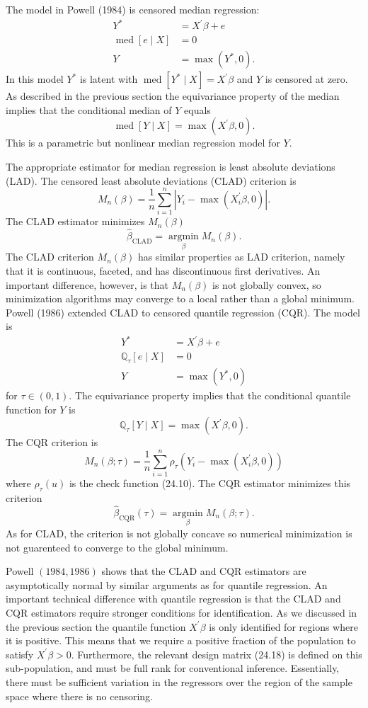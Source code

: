 \documentclass[10pt]{article}
\begin{document}
The model in Powell (1984) is censored median regression:
$$
\begin{aligned}
Y^{*} &=X^{\prime} \beta+e \\
\operatorname{med}[e \mid X] &=0 \\
Y &=\max \left(Y^{*}, 0\right) .
\end{aligned}
$$
In this model $Y^{*}$ is latent with $\operatorname{med}\left[Y^{*} \mid X\right]=X^{\prime} \beta$ and $Y$ is censored at zero. As described in the previous section the equivariance property of the median implies that the conditional median of $Y$ equals
$$
\operatorname{med}[Y \mid X]=\max \left(X^{\prime} \beta, 0\right) .
$$
This is a parametric but nonlinear median regression model for $Y$.

The appropriate estimator for median regression is least absolute deviations (LAD). The censored least absolute deviations (CLAD) criterion is
$$
M_{n}(\beta)=\frac{1}{n} \sum_{i=1}^{n}\left|Y_{i}-\max \left(X_{i}^{\prime} \beta, 0\right)\right| .
$$
The CLAD estimator minimizes $M_{n}(\beta)$
$$
\widehat{\beta}_{\mathrm{CLAD}}=\underset{\beta}{\operatorname{argmin}} M_{n}(\beta) .
$$
The CLAD criterion $M_{n}(\beta)$ has similar properties as LAD criterion, namely that it is continuous, faceted, and has discontinuous first derivatives. An important difference, however, is that $M_{n}(\beta)$ is not globally convex, so minimization algorithms may converge to a local rather than a global minimum. Powell (1986) extended CLAD to censored quantile regression (CQR). The model is
$$
\begin{aligned}
Y^{*} &=X^{\prime} \beta+e \\
\mathbb{Q}_{\tau}[e \mid X] &=0 \\
Y &=\max \left(Y^{*}, 0\right)
\end{aligned}
$$
for $\tau \in(0,1)$. The equivariance property implies that the conditional quantile function for $Y$ is
$$
\mathbb{Q}_{\tau}[Y \mid X]=\max \left(X^{\prime} \beta, 0\right) .
$$
The CQR criterion is
$$
M_{n}(\beta ; \tau)=\frac{1}{n} \sum_{i=1}^{n} \rho_{\tau}\left(Y_{i}-\max \left(X_{i}^{\prime} \beta, 0\right)\right)
$$
where $\rho_{\tau}(u)$ is the check function (24.10). The CQR estimator minimizes this criterion
$$
\widehat{\beta}_{\mathrm{CQR}}(\tau)=\underset{\beta}{\operatorname{argmin}} M_{n}(\beta ; \tau) .
$$
As for CLAD, the criterion is not globally concave so numerical minimization is not guarenteed to converge to the global minimum.

Powell $(1984,1986)$ shows that the CLAD and CQR estimators are asymptotically normal by similar arguments as for quantile regression. An important technical difference with quantile regression is that the CLAD and CQR estimators require stronger conditions for identification. As we discussed in the previous section the quantile function $X^{\prime} \beta$ is only identified for regions where it is positive. This means that we require a positive fraction of the population to satisfy $X^{\prime} \beta>0$. Furthermore, the relevant design matrix (24.18) is defined on this sub-population, and must be full rank for conventional inference. Essentially, there must be sufficient variation in the regressors over the region of the sample space where there is no censoring.
\end{document}
